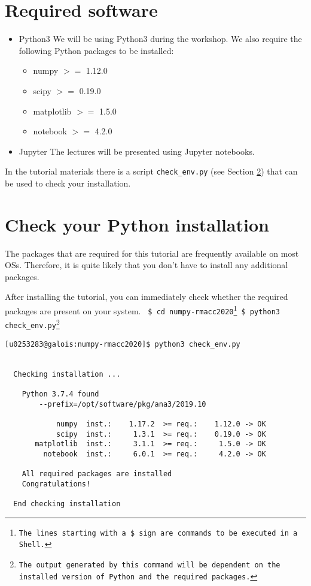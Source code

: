 \documentclass[11pt]{article}
\begin{document}
\section{Required software}
\begin{itemize}
  \item Python$3$ \newline
        We will be using Python$3$ during the workshop.
        We also require the following Python packages to be installed:
        \begin{itemize}
           \item numpy $>=$ 1.12.0 
           \item scipy $>=$ 0.19.0
           \item matplotlib $>=$ 1.5.0
           \item notebook $>=$ 4.2.0
        \end{itemize} 

  \item Jupyter \newline
        The lectures will be presented using Jupyter notebooks.
\end{itemize}

In the tutorial materials there is a script \texttt{check\_env.py} 
(see Section \ref{section:check}) that can be used to check your installation.


\section{Check your Python installation}\label{section:check}
The packages that are required for this tutorial are frequently available 
on most OSs.
Therefore, it is quite likely that you don't have to install any additional packages.

After installing the tutorial, you can immediately check whether the required packages 
are present on your system. \newline\newline
\texttt{
\$ cd numpy-rmacc2020\footnote{The lines starting with a \$ sign are commands to be executed in a Shell.} \newline
\$ python3 check\_env.py\footnote{The output generated by this command will be dependent on the installed version of Python and the required packages.}\newline
}
\begin{verbatim}
[u0253283@galois:numpy-rmacc2020]$ python3 check_env.py


  Checking installation ...

    Python 3.7.4 found
        --prefix=/opt/software/pkg/ana3/2019.10

            numpy  inst.:    1.17.2  >= req.:    1.12.0 -> OK 
            scipy  inst.:     1.3.1  >= req.:    0.19.0 -> OK 
       matplotlib  inst.:     3.1.1  >= req.:     1.5.0 -> OK 
         notebook  inst.:     6.0.1  >= req.:     4.2.0 -> OK 

    All required packages are installed
    Congratulations!

  End checking installation
\end{verbatim}
\end{document}
